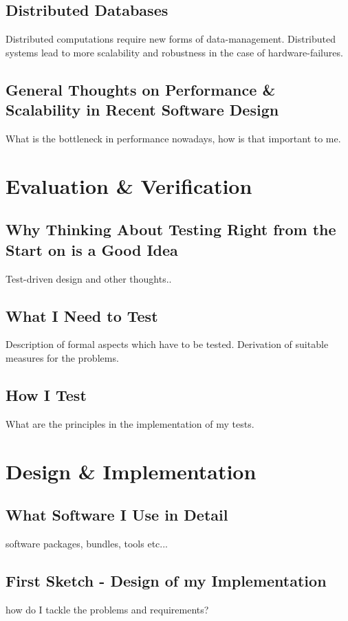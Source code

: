 \documentclass[12p]{scrartcl}
\begin{document}
\subsection{Distributed Databases}
Distributed computations require new forms of data-management. Distributed systems lead to more scalability and robustness in the case of hardware-failures.
\subsection{General Thoughts on Performance \& Scalability in Recent Software Design}
What is the bottleneck in performance nowadays, how is that important to me.



\section{Evaluation \& Verification}
\subsection{Why Thinking About Testing Right from the Start on is a Good Idea}
Test-driven design and other thoughts..
\subsection{What I Need to Test}
Description of formal aspects which have to be tested. Derivation of suitable measures for the problems.
\subsection{How I Test}
What are the principles in the implementation of my tests.
 

\section{Design \& Implementation}
\subsection{What Software I Use in Detail}
software packages, bundles, tools etc...
\subsection{First Sketch - Design of my Implementation}
how do I tackle the problems and requirements?
\end{document}
